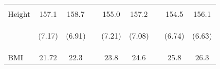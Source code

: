 \documentclass{article}[11pt,subeqn]
\begin{document}
\begin{spacing}{1.5}
\begin{table}[ht]
\begin{center}
\begin{tabular}{lccp{5mm}ccp{5mm}cc}
\begin{footnotesize}\end{footnotesize}	&	\begin{footnotesize}\end{footnotesize}	&	\begin{footnotesize}\end{footnotesize}	&	\begin{footnotesize}\end{footnotesize} &	\begin{footnotesize}\end{footnotesize}	&	\begin{footnotesize}\end{footnotesize}	&	\begin{footnotesize}\end{footnotesize} &	\begin{footnotesize}\end{footnotesize}	&	\begin{footnotesize}\end{footnotesize}		\\
Height	&	157.1	&	158.7	&	&	155.0	&	157.2	&	&	154.5	&	156.1		\\
\begin{footnotesize}\end{footnotesize}	& \begin{footnotesize} (7.17)\end{footnotesize} & \begin{footnotesize} (6.91)\end{footnotesize} & \begin{footnotesize} 	\end{footnotesize} & \begin{footnotesize} (7.21)\end{footnotesize} & \begin{footnotesize} (7.08)\end{footnotesize} & \begin{footnotesize} 	\end{footnotesize} & \begin{footnotesize} (6.74)\end{footnotesize} & \begin{footnotesize} (6.63)\end{footnotesize}	\\
BMI	&	21.72	&	22.3	&	&	23.8	&	24.6	&	&	25.8	&	26.3		\\

\end{tabular}
\end{center}
\end{table}
\end{spacing}
\end{document}
